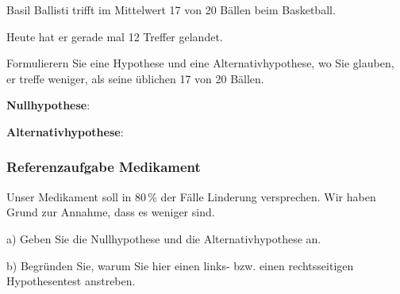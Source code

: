 Basil Ballisti trifft im Mittelwert 17 von 20 Bällen beim Basketball.

Heute hat er gerade mal 12 Treffer gelandet.

Formulierern Sie eine Hypothese und eine Alternativhypothese, wo Sie
glauben, er treffe weniger, als seine üblichen 17 von 20 Bällen.


\textbf{Nullhypothese}:


\textbf{Alternativhypothese}:



\newpage




\subsubsection{Referenzaufgabe Medikament}
Unser Medikament soll in 80\,\% der Fälle Linderung versprechen. Wir haben Grund zur Annahme, dass es weniger sind.

a) Geben Sie die Nullhypothese und die Alternativhypothese an.


b) Begründen Sie, warum Sie hier einen links- bzw. einen rechtsseitigen Hypothesentest anstreben.

\newpage
